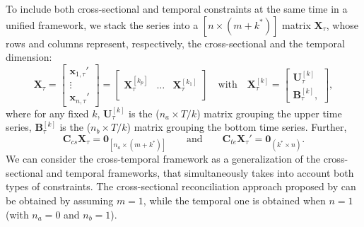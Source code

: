 \documentclass[a4paper,11pt]{article}
\newcommand{\xvet}{\bm{x}}
\newcommand{\Bvet}{\bm{B}}
\newcommand{\Cvet}{\bm{C}}
\newcommand{\Uvet}{\bm{U}}
\newcommand{\Xvet}{\bm{X}}
\newcommand{\Zerovet}{\bm{0}}
\theoremstyle{definition}
\begin{document}
To include both cross-sectional and temporal constraints at the same time in a unified framework, we stack the series into a $[n \times (m+k^\ast)]$ matrix $\Xvet_\tau$, whose rows and columns represent, respectively, the cross-sectional and the temporal dimension:
\begin{equation}
	\label{eq:Xtau}
	\Xvet_\tau = \begin{bmatrix}
		\xvet_{1,\tau}' \\
		\vdots          \\
		\xvet_{n,\tau}'
	\end{bmatrix} = \begin{bmatrix}
		\Xvet_{\tau}^{[k_p]} & \dots & \Xvet_{\tau}^{[k_1]} \\ \end{bmatrix}
	\quad \text{with} \quad \Xvet_{\tau}^{[k]} = \begin{bmatrix}
		\Uvet_{\tau}^{[k]} \\
		\Bvet_{\tau}^{[k]},
	\end{bmatrix},
\end{equation}
where for any fixed $k$,
$\Uvet_{\tau}^{[k]}$ is the ($n_a\times T/k$) matrix grouping the upper time series, $\Bvet_{\tau}^{[k]}$ is the ($n_b\times T/k$) matrix grouping the bottom time series. Further,
$$
	\Cvet_{cs}\Xvet_\tau = \Zerovet_{\left[n_a \times (m+k^\ast)\right]} \qquad \text{and} \qquad \Cvet_{te}\Xvet_\tau' = \Zerovet_{(k^\ast \times n)} .
$$
We can consider the cross-temporal framework as a generalization of the cross-sectional and temporal frameworks, that simultaneously takes into account both types of constraints. The cross-sectional reconciliation approach proposed by \cite{hyndman2011} can be obtained by assuming $m = 1$, while the temporal one \citep{athanasopoulos2017} is obtained when $n = 1$ (with $n_a = 0$ and $n_b = 1$).


\end{document}
